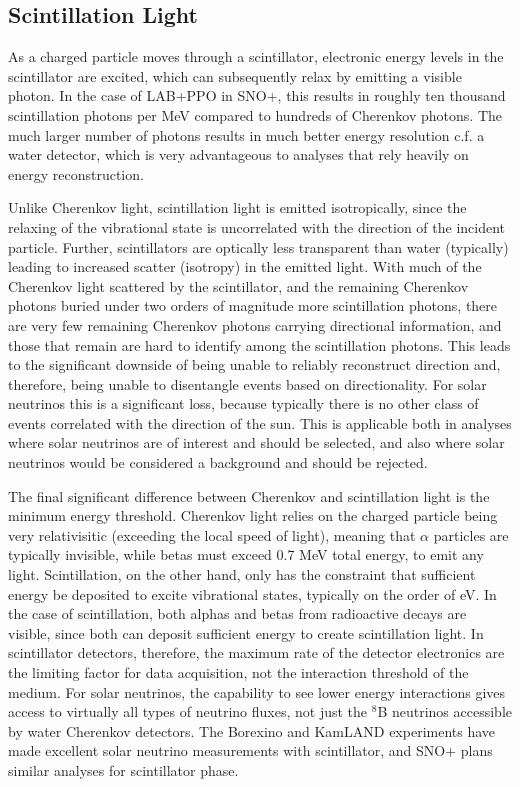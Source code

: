 \subsection{Scintillation Light}

As a charged particle moves through a scintillator, electronic energy levels in the scintillator are excited, which can subsequently relax by emitting a visible photon.
In the case of LAB+PPO in SNO+, this results in roughly ten thousand scintillation photons per MeV compared to hundreds of Cherenkov photons.
The much larger number of photons results in much better energy resolution c.f. a water detector, which is very advantageous to analyses that rely heavily on energy reconstruction.

Unlike Cherenkov light, scintillation light is emitted isotropically, since the relaxing of the vibrational state is uncorrelated with the direction of the incident particle.
Further, scintillators are optically less transparent than water (typically) leading to increased scatter (isotropy) in the emitted light.
With much of the Cherenkov light scattered by the scintillator, and the remaining Cherenkov photons buried under two orders of magnitude more scintillation photons, there are very few remaining Cherenkov photons carrying directional information, and those that remain are hard to identify among the scintillation photons.
This leads to the significant downside of being unable to reliably reconstruct direction and, therefore, being unable to disentangle events based on directionality. 
For solar neutrinos this is a significant loss, because typically there is no other class of events correlated with the direction of the sun.
This is applicable both in analyses where solar neutrinos are of interest and should be selected, and also where solar neutrinos would be considered a background and should be rejected.

The final significant difference between Cherenkov and scintillation light is the minimum energy threshold.
Cherenkov light relies on the charged particle being very relativisitic (exceeding the local speed of light), meaning that $\alpha$ particles are typically invisible, while betas must exceed 0.7 MeV total energy, to emit any light.
Scintillation, on the other hand, only has the constraint that sufficient energy be deposited to excite vibrational states, typically on the order of eV.
In the case of scintillation, both alphas and betas from radioactive decays are visible, since both can deposit sufficient energy to create scintillation light.
In scintillator detectors, therefore, the maximum rate of the detector electronics are the limiting factor for data acquisition, not the interaction threshold of the medium.
For solar neutrinos, the capability to see lower energy interactions gives access to virtually all types of neutrino fluxes, not just the $^8$B neutrinos accessible by water Cherenkov detectors.
The Borexino \cite{borexino} and KamLAND \cite{kamland} experiments have made excellent solar neutrino measurements with scintillator, and SNO+ plans similar analyses for scintillator phase.

